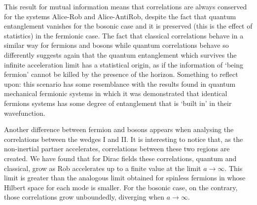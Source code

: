 This result for mutual information means that correlations are always conserved for the systems Alice-Rob and Alice-AntiRob, despite the fact that quantum entanglement vanishes for the bosonic case and it is preserved (this is the effect of statistics) in the fermionic case. The fact that classical correlations behave in a similar way for fermions and bosons while quantum correlations behave so differently suggests again that the quantum entanglement which survives the infinite acceleration limit has a statistical origin, as if the information of `being fermion' cannot be killed by the presence of the horizon. Something to reflect upon: this scenario has some resemblance with the results found in quantum mechanical fermionic systems \cite{sta1} in which it was demonstrated that identical fermions systems has some degree of entanglement that is `built in' in their wavefunction.

Another difference between fermion and bosons appears when analysing the correlations between the wedges I and II. It is interesting to notice that, as the non-inertial partner accelerates, correlations between these two regions  are created. We have found that for Dirac fields these correlations, quantum and classical, grow as Rob accelerates up to a finite value at the limit $a\rightarrow\infty$. This limit is greater than the analogous limit  obtained for spinless fermions in \cite{AlsingSchul} whose Hilbert space for each mode is smaller. For the bosonic case, on the contrary, those correlations grow unboundedly, diverging when $a\rightarrow\infty$. 

